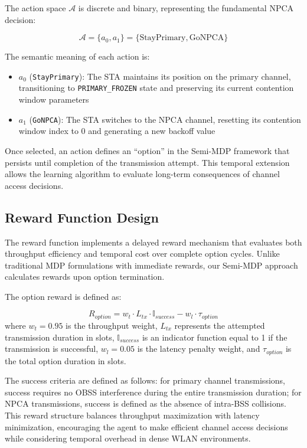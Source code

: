 \documentclass[conference]{IEEEtran}
\begin{document}
The action space $\mathcal{A}$ is discrete and binary, representing the fundamental NPCA decision:

\begin{equation}
\mathcal{A} = \{a_0, a_1\} = \{\text{StayPrimary}, \text{GoNPCA}\}
\label{eq:action_space}
\end{equation}

The semantic meaning of each action is:

\begin{itemize}
\item $a_0$ (\texttt{StayPrimary}): The STA maintains its position on the primary channel, transitioning to \texttt{PRIMARY\_FROZEN} state and preserving its current contention window parameters
\item $a_1$ (\texttt{GoNPCA}): The STA switches to the NPCA channel, resetting its contention window index to 0 and generating a new backoff value
\end{itemize}

Once selected, an action defines an ``option'' in the Semi-MDP framework that persists until completion of the transmission attempt. This temporal extension allows the learning algorithm to evaluate long-term consequences of channel access decisions.

\subsection{Reward Function Design}

The reward function implements a delayed reward mechanism that evaluates both throughput efficiency and temporal cost over complete option cycles. Unlike traditional MDP formulations with immediate rewards, our Semi-MDP approach calculates rewards upon option termination.

The option reward is defined as:

\begin{equation}
R_{option} = w_t \cdot L_{tx} \cdot \mathbb{I}_{success} - w_l \cdot \tau_{option}
\label{eq:reward_function}
\end{equation}
where $w_t = 0.95$ is the throughput weight, $L_{tx}$ represents the attempted transmission duration in slots, $\mathbb{I}_{success}$ is an indicator function equal to 1 if the transmission is successful, $w_l = 0.05$ is the latency penalty weight, and $\tau_{option}$ is the total option duration in slots.

The success criteria are defined as follows: for primary channel transmissions, success requires no OBSS interference during the entire transmission duration; for NPCA transmissions, success is defined as the absence of intra-BSS collisions. This reward structure balances throughput maximization with latency minimization, encouraging the agent to make efficient channel access decisions while considering temporal overhead in dense WLAN environments.
\end{document}
